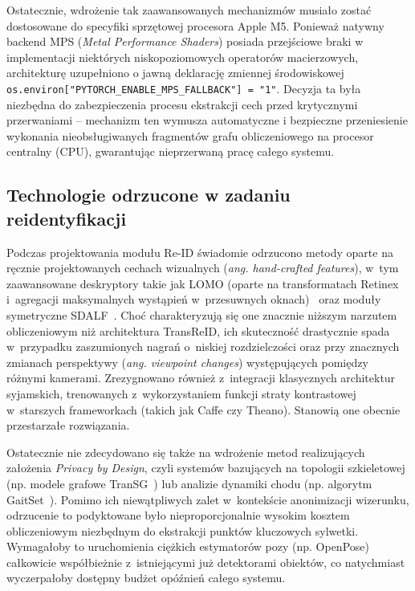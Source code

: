 Ostatecznie, wdrożenie tak zaawansowanych mechanizmów musiało zostać dostosowane do specyfiki
sprzętowej procesora Apple M5. Ponieważ natywny backend MPS (\textit{Metal Performance Shaders})
posiada przejściowe braki w implementacji niektórych niskopoziomowych operatorów macierzowych,
architekturę uzupełniono o jawną deklarację zmiennej środowiskowej
\texttt{os.environ["PYTORCH\_ENABLE\_MPS\_FALLBACK"] = "1"}. Decyzja ta była niezbędna do
zabezpieczenia procesu ekstrakcji cech przed krytycznymi przerwaniami -- mechanizm ten wymusza
automatyczne i bezpieczne przeniesienie wykonania nieobsługiwanych fragmentów grafu obliczeniowego
na procesor centralny (CPU), gwarantując nieprzerwaną pracę całego systemu.

\subsection{Technologie odrzucone w zadaniu reidentyfikacji}

Podczas projektowania modułu Re-ID świadomie odrzucono metody oparte na ręcznie projektowanych
cechach wizualnych (\textit{ang. hand-crafted features}), w~tym zaawansowane deskryptory takie jak
LOMO (oparte na transformatach Retinex i~agregacji maksymalnych wystąpień w~przesuwnych
oknach)~\cite{liao2015} oraz moduły symetryczne SDALF~\cite{bazzani2013}. Choć charakteryzują się
one znacznie niższym narzutem obliczeniowym niż architektura TransReID, ich skuteczność drastycznie
spada w~przypadku zaszumionych nagrań o~niskiej rozdzielczości oraz przy znacznych zmianach
perspektywy (\textit{ang. viewpoint changes}) występujących pomiędzy różnymi kamerami. Zrezygnowano
również z~integracji klasycznych architektur syjamskich, trenowanych z~wykorzystaniem funkcji
straty kontrastowej w~starszych frameworkach (takich jak Caffe czy Theano). Stanowią one obecnie
przestarzałe rozwiązania.

Ostatecznie nie zdecydowano się także na wdrożenie metod realizujących założenia \textit{Privacy by
  Design}, czyli systemów bazujących na topologii szkieletowej (np. modele grafowe
TranSG~\cite{rao2023}) lub analizie dynamiki chodu (np. algorytm GaitSet~\cite{chao2019gaitset}).
Pomimo ich niewątpliwych zalet w~kontekście anonimizacji wizerunku, odrzucenie to podyktowane było
nieproporcjonalnie wysokim kosztem obliczeniowym niezbędnym do ekstrakcji punktów kluczowych
sylwetki. Wymagałoby to uruchomienia ciężkich estymatorów pozy (np. OpenPose) całkowicie
współbieżnie z~istniejącymi już detektorami obiektów, co natychmiast wyczerpałoby dostępny budżet
opóźnień całego systemu.

